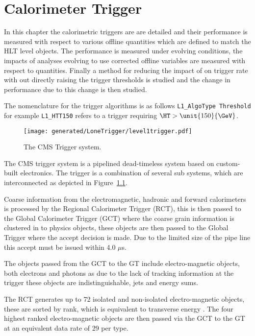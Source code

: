 \chapter{\Lone Calorimeter Trigger} %
\label{cha:level_one_trigger}
In this chapter the \Lone calorimetric triggers are are detailed and their performance is measured with respect to various offline quantities which are defined to match the HLT level objects. The performance is measured under evolving \pu conditions, the impacts of analyses evolving to use \pu corrected offline variables are measured with respect to \Lone quantities. Finally a method for reducing the impact of \pu on \Lone trigger rate with out directly raising the trigger thresholds is studied and the change in performance due to this change is then studied.

The nomenclature for the \Lone trigger algorithms is as follows \verb|L1_AlgoType Threshold| for example \verb|L1_HTT150| refers to a \Lone trigger requiring $\HT > \unit{150}{\GeV}$.

\begin{figure}[ht]
  \centering
    \texttt{[image: generated/LoneTrigger/level1trigger.pdf]}
  \caption{The CMS \Lone Trigger system.}
  \label{fig:figures_LoneTrigger_level1trigger}
\end{figure}

The CMS \Lone trigger system\cite{l1} is a pipelined dead-timeless system based 
on custom-built electronics.
The \Lone trigger is a combination of several sub systems, which are 
interconnected as depicted in 
Figure~\ref{fig:figures_LoneTrigger_level1trigger}.

Coarse information from the electromagnetic, hadronic and forward 
calorimeters is processed by the Regional Calorimeter Trigger (RCT), this is 
then passed to the Global Calorimeter Trigger (GCT) where the coarse grain 
information is clustered in to physics objects, these objects are then passed 
to the Global Trigger where the \Lone accept decision is made. Due to the 
limited size of the pipe line this \Lone accept must be issued within 4.0 
$\mu$s.

The objects passed from the GCT to the GT include electro-magnetic objects, 
both electrons and photons as due to the lack of
tracking information at the \Lone trigger these objects are indistinguishable, 
jets and energy sums.

The RCT generates up to 72 isolated and non-isolated electro-magnetic objects, 
these are sorted by rank, which is equivalent to
transverse energy \ET. The four highest ranked electro-magnetic objects are 
then passed via the GCT to the GT at an equivalent data 
rate of 29 \Gbs per type.

